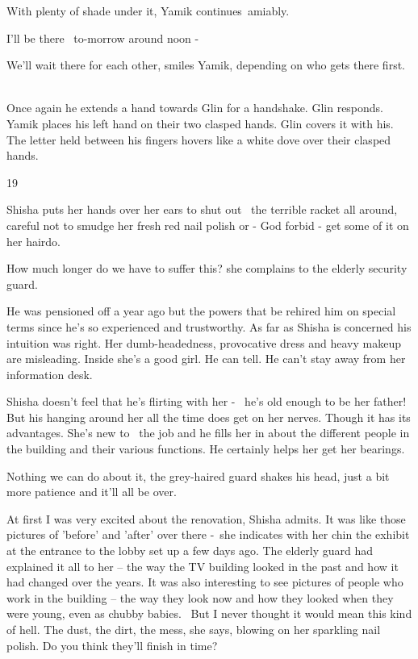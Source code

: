 \documentclass[letterpaper]{article}
\begin{document}
{\textquotedbl}With plenty of shade under it,{\textquotedbl} Yamik continues~amiably. 

{\textquotedbl}I'll be there \ to-morrow around noon -{\textquotedbl}

{\textquotedbl}We'll wait there for each other,{\textquotedbl} smiles Yamik, {\textquotedbl}depending on who gets there
first.{\textquotedbl} ~

Once again he extends a hand towards Glin for a handshake. Glin responds. Yamik places his left hand on their two
clasped hands. Glin covers it with his. The letter held between his fingers hovers like a white dove over their clasped
hands.


\bigskip

19 

Shisha puts her hands over her ears to shut out \ the terrible racket all around, careful not to smudge her fresh red
nail polish or - God forbid - get some of it on her hairdo. 

{\textquotedbl}How much longer do we have to suffer this?{\textquotedbl} she complains to the elderly security guard.

He was pensioned off a year ago but the powers that be rehired him on special terms since he's so experienced and
trustworthy. As far as Shisha is concerned his intuition was right. Her dumb-headedness, provocative dress and heavy
makeup are misleading. Inside she's a good girl. He can tell. He can't stay away from her information desk.

Shisha doesn't feel that he's flirting with her - \ he's old enough to be her father! But his hanging around her all the
time does get on her nerves. Though it has its advantages. She's new to{ }\ the job and he fills her in
about the different people in the building and their various functions. He certainly helps her get her bearings.

{\textquotedbl}Nothing we can do about it,{\textquotedbl} the grey-haired guard shakes his head, {\textquotedbl}just a
bit more patience and it'll all be over.{\textquotedbl} ~

{\textquotedbl}At first I was very excited about the renovation,{\textquotedbl} Shisha admits. {\textquotedbl}It was
like those pictures of 'before' and 'after' over there -{\textquotedbl}~she indicates with her chin the exhibit at the
entrance to the lobby set up a few days ago. The elderly guard had explained it all to her -- the way the TV building
looked in the past and how it had changed over the years. It was also interesting to see pictures of people who work in
the building -- the way they look now and how they looked when they were young, even as chubby babies.
~{\textquotedbl}But I never thought it would mean this kind of hell. The dust, the dirt, the mess,{\textquotedbl} she
says, blowing on her sparkling nail polish. {\textquotedbl}Do you think they'll finish in time?{\textquotedbl} 
\end{document}
